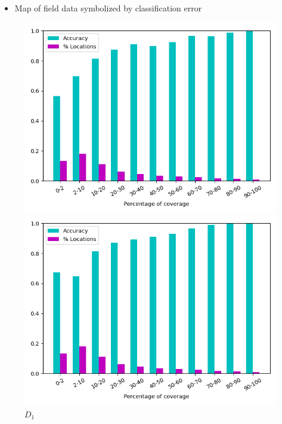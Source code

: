 \documentclass{article} %
\begin{document}
\begin{itemize}
\item{Map of field data symbolized by classification error}
\end{itemize}
\begin{figure}
\centering
\begin{minipage}{.24\textwidth}
  \centering
\includegraphics[width=\textwidth]{pics/d1_accuracy_vs_coverage.png}
\caption{$D_1$}
\end{minipage}
\begin{minipage}{.01\textwidth}
\end{minipage}
\begin{minipage}{.24\textwidth}
  \centering
\includegraphics[width=\textwidth]{pics/d2_accuracy_vs_coverage.png}

\end{minipage}
\end{figure}
\end{document}
